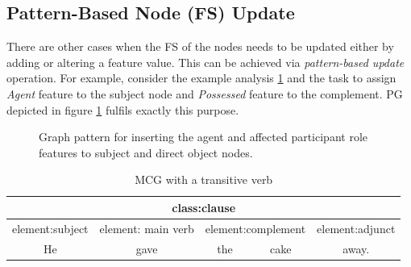 \subsection{Pattern-Based Node (FS) Update} 
There are other cases when the FS of the nodes needs to be updated either by adding or altering a feature value. This can be achieved via \textit{pattern-based update} operation. For example, consider the example analysis \ref{tab:transitive1} and the task to assign \textit{Agent} feature to the subject node and \textit{Possessed} feature to the complement. PG depicted in figure \ref{fig:gp2} fulfils exactly this purpose.

\begin{figure}[H]
\centering
{}
\caption{Graph pattern for inserting the agent and affected participant role features to subject and direct object nodes.}
\label{fig:gp2}
\end{figure}

\begin{table}[ht]
\centering
\begin{tabular}{|c|c|c|c|c|}
\hline
\multicolumn{5}{|c|}{class:clause}                                                               \\ \hline
element:subject & element: main verb & \multicolumn{2}{c|}{element:complement} & element:adjunct \\ \hline
He              & gave               & the               & cake               & away.            \\ \hline
\end{tabular}
\caption{MCG with a transitive verb}
\label{tab:transitive1}
\end{table}

